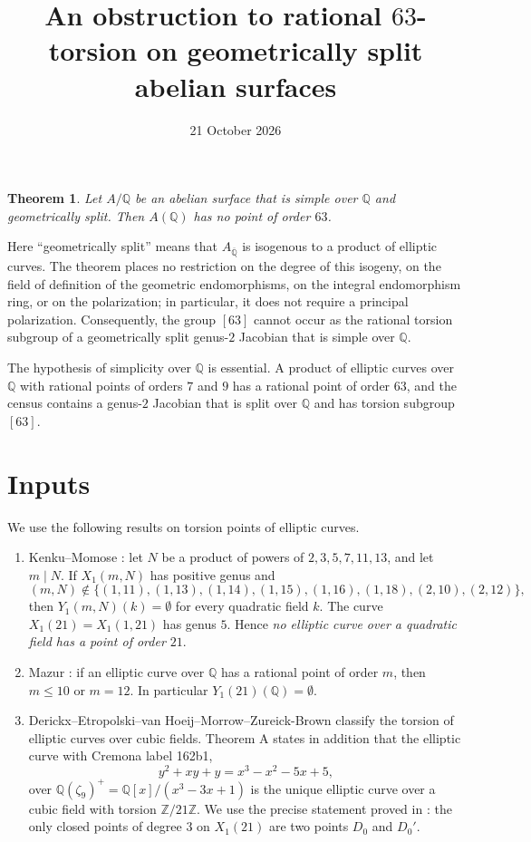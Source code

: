 \documentclass[11pt]{article}
\title{An obstruction to rational \(63\)-torsion on geometrically split abelian surfaces}
\author{}
\date{21 October 2026}
\newtheorem{theorem}{Theorem}
\newcommand{\Q}{\mathbb Q}
\newcommand{\Z}{\mathbb Z}
\begin{document}
\maketitle

\begin{theorem}\label{thm:main}
Let \(A/\Q\) be an abelian surface that is simple over \(\Q\) and
geometrically split. Then \(A(\Q)\) has no point of order \(63\).
\end{theorem}

Here ``geometrically split'' means that \(A_{\overline{\Q}}\) is
isogenous to a product of elliptic curves. The theorem places no
restriction on the degree of this isogeny, on the field of definition of
the geometric endomorphisms, on the integral endomorphism ring, or on the
polarization; in particular, it does not require a principal
polarization. Consequently, the group
\href{https://genus-2-torsion.github.io/group.html?g=63}{\([63]\)}
cannot occur as the rational torsion subgroup of a geometrically split
genus-\(2\) Jacobian that is simple over \(\Q\).

The hypothesis of simplicity over \(\Q\) is essential. A product of
elliptic curves over \(\Q\) with rational points of orders \(7\) and
\(9\) has a rational point of order \(63\), and the census contains a
genus-\(2\) Jacobian that is split over \(\Q\) and has torsion subgroup
\([63]\).

\section{Inputs}\label{sec:inputs}

We use the following results on torsion points of elliptic curves.
\begin{enumerate}
\item Kenku--Momose \cite[Theorem (0.1)]{KM}: let \(N\) be a product of
powers of \(2,3,5,7,11,13\), and let \(m\mid N\). If \(X_1(m,N)\) has
positive genus and
\[
 (m,N)\notin\{(1,11),(1,13),(1,14),(1,15),(1,16),(1,18),(2,10),(2,12)\},
\]
then \(Y_1(m,N)(k)=\emptyset\) for every quadratic field \(k\). The
curve \(X_1(21)=X_1(1,21)\) has genus \(5\). Hence \emph{no elliptic
curve over a quadratic field has a point of order \(21\)}.
\item Mazur \cite[Theorem (7\('\))]{Mazur}: if an elliptic curve over
\(\Q\) has a rational point of order \(m\), then \(m\leq10\) or
\(m=12\). In particular \(Y_1(21)(\Q)=\emptyset\).
\item Derickx--Etropolski--van Hoeij--Morrow--Zureick-Brown
\cite[Theorem A]{DEvHMZB} classify the torsion of elliptic curves over
cubic fields. Theorem A states in addition that the elliptic curve with
Cremona label 162b1,
\[
 y^2+xy+y=x^3-x^2-5x+5,
\]
over \(\Q(\zeta_9)^+=\Q[x]/(x^3-3x+1)\) is the unique elliptic curve
over a cubic field with torsion \(\Z/21\Z\). We use the precise
statement proved in \cite[Section 6.2]{DEvHMZB}: the only closed points
of degree \(3\) on \(X_1(21)\) are two points \(D_0\) and \(D_0'\).
\end{enumerate}
\end{document}
